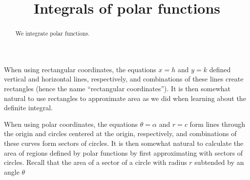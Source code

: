 \documentclass{ximera}
\title[Dig-In:]{Integrals of polar functions}
\begin{document}
\begin{abstract}
  We integrate polar functions.
\end{abstract}
\maketitle


When using rectangular coordinates, the equations $x=h$ and $y=k$
defined vertical and horizontal lines, respectively, and combinations
of these lines create rectangles (hence the name ``rectangular
coordinates''). It is then somewhat natural to use rectangles to
approximate area as we did when learning about the definite
integral.

When using polar coordinates, the equations $\theta=\alpha$ and $r=c$
form lines through the origin and circles centered at the origin,
respectively, and combinations of these curves form sectors of
circles. It is then somewhat natural to calculate the area of regions
defined by polar functions by first approximating with sectors of
circles. Recall that the area of a sector of a circle with radius $r$
subtended by an angle $\theta$
\begin{image}
\end{image}
\end{document}
